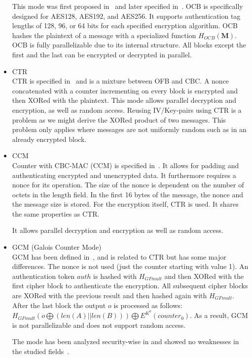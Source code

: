 \begin{itemize}
	This mode was first proposed in~\cite{rogaway2003ocb} and later specified in~\cite{krovetz-ocb-04}. OCB is specifically designed for AES128, AES192, and AES256. It supports authentication tag lengths of 128, 96, or 64 bits for each specified encryption algorithm. OCB hashes the plaintext of a message with a specialized function $H_{OCB}(\mathbf{M})$. OCB is fully parallelizable due to its internal structure. All blocks except the first and the last can be encrypted or decrypted in parallel.
	\item CTR\\
	CTR is specified in~\cite{lipmaa2000ctr} and is a mixture between OFB and CBC. A nonce concatenated with a counter incrementing on every block is encrypted and then XORed with the plaintext. This mode allows parallel decryption and encryption, as well as random access. Reusing IV/Key-pairs using CTR is a problem as we might derive the XORed product of two messages. This problem only applies where messages are not uniformly random such as in an already encrypted block.
	\item CCM\\
	Counter with CBC-MAC (CCM) is specified in~\cite{rfc3610}. It allows for padding and authenticating encrypted and unencrypted data. It furthermore requires a nonce for its operation. The size of the nonce is dependent on the number of octets in the length field. In the first 16 bytes of the message, the nonce and the message size is stored. For the encryption itself, CTR is used. It shares the same properties as CTR. 
	
	It allows parallel decryption and encryption as well as random access.
	\item GCM (Galois Counter Mode)\\
	GCM has been defined in~\cite{mcgrew2004galois}, and is related to CTR but has some major differences. The nonce is not used (just the counter starting with value 1). An authentication token $auth$ is hashed with $H_{GFmult}$ and then XORed with the first cipher block to authenticate the encryption. All subsequent cipher blocks are XORed with the previous result and then hashed again with $H_{GFmult}$. After the last block the output $o$ is processed  as follows: $H_{GFmult}(o\bigoplus (len(A)||len(B))) \bigoplus E^{K^0}(counter_0)$. As a result, GCM is not parallelizable and does not support random access.
	
	The mode has been analyzed security-wise in \citeyear{mcgrew2004security} and showed no weaknesses in the studied fields~\cite{mcgrew2004security}. 
	

\end{itemize}
